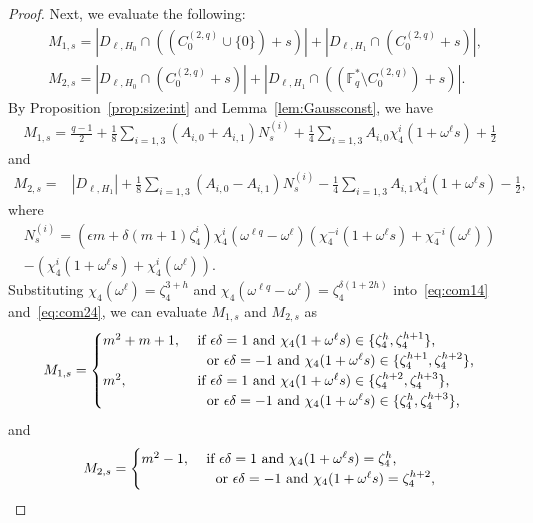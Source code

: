 \documentclass[ALCO,ThmDefs,Unicode]{cedram}
\newcommand*\F{{\mathbb F}}
\begin{document}
\begin{proof}
Next, we evaluate the following:
\begin{align*}
&M_{1,s}=|D_{\ell,H_0}\cap ((C_0^{(2,q)}\cup \{0\})+s)|+ |D_{\ell,H_1}\cap (C_0^{(2,q)}+s)|,\\
&M_{2,s}=|D_{\ell,H_0}\cap (C_0^{(2,q)}+s)|+ |D_{\ell,H_1}\cap ((\F_q^\ast \setminus C_0^{(2,q)})+s)|.
\end{align*}
By Proposition~\ref{prop:size:int} and Lemma~\ref{lem:Gaussconst}, we have
\begin{align}
M_{1,s} =\frac{q-1}{2}+\frac{1}{8}\sum_{i=1,3}(A_{i,0}+A_{i,1})N_{s}^{(i)}+\frac{1}{4}\sum_{i=1,3}A_{i,0}\chi_4^i(1+\omega^\ell s) +\frac{1}{2}\label{eq:com14}
\end{align}
and
\begin{align}
M_{2,s}=&|D_{\ell,H_1}|+\frac{1}{8}\sum_{i=1,3}(A_{i,0}-A_{i,1})N_{s}^{(i)}-\frac{1}{4}\sum_{i=1,3}A_{i,1}\chi_4^i(1+\omega^\ell s) -\frac{1}{2}, \label{eq:com24}
\end{align}
where
\begin{multline*}
N_s^{(i)}=(\epsilon m+\delta(m+1)\zeta_4^i)\chi_4^i(\omega^{\ell q}-\omega^\ell) (\chi_4^{-i}(1+\omega^{\ell} s)+\chi_4^{-i}(\omega^{\ell}))\\
 -(\chi_4^i(1+\omega^\ell s)+\chi_4^i(\omega^\ell)).
\end{multline*}
Substituting $\chi_4(\omega^{\ell})=\zeta_4^{3+h}$ and $\chi_4(\omega^{\ell q}-\omega^{\ell})=\zeta_4^{\delta (1+2h)}$ into~\eqref{eq:com14} and~\eqref{eq:com24}, we can evaluate $M_{1,s}$ and $M_{2,s}$ as
\begin{equation*}
M_{1,s}=
\begin{cases}
m^2+m+1,& \text{ if $\epsilon \delta=1$ and $\chi_4(1+\omega^\ell s)\in \{\zeta_4^{h},\zeta_4^{h+1}\}$,} \\
&\text{\quad or $\epsilon \delta=-1$ and $\chi_4(1+\omega^\ell s)\in \{\zeta_4^{h+1},\zeta_4^{h+2}\}$,}
\\
m^2,& \text{ if $\epsilon \delta=1$ and $\chi_4(1+\omega^\ell s)\in \{\zeta_4^{h+2},\zeta_4^{h+3}\}$,}\\
& \text{\quad or $\epsilon \delta=-1$ and $\chi_4(1+\omega^\ell s)\in \{\zeta_4^{h},\zeta_4^{h+3}\}$,}
\end{cases}
\end{equation*}
and
\begin{equation*}
M_{2,s}=
\begin{cases}
m^2-1,& \text{ if $\epsilon \delta=1$ and $\chi_4(1+\omega^\ell s)=\zeta_4^{h}$,}
\\
& \text{\quad or $\epsilon \delta=-1$ and $\chi_4(1+\omega^\ell s)=\zeta_4^{h+2}$,}

\end{cases}
\end{equation*}
\end{proof}
\end{document}
